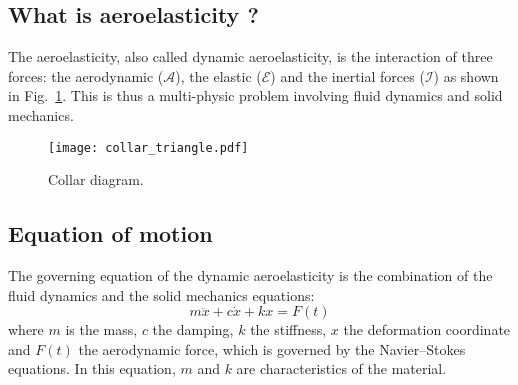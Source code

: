
\subsection{What is aeroelasticity ?}
\label{sub:ael_what_is_aeroelasticity}

The aeroelasticity, also called dynamic aeroelasticity,
is the interaction of three forces:
the aerodynamic ($\mathcal{A}$), the elastic ($\mathcal{E}$) and
the inertial forces ($\mathcal{I}$) as 
shown in Fig.~\ref{fig:ael_collar_triangle}. 
This is thus a 
multi-physic problem involving fluid dynamics and
solid mechanics.
\begin{figure}[htb]
  \centering
  \texttt{[image: collar\_triangle.pdf]}
  \caption{Collar diagram.}
  \label{fig:ael_collar_triangle}
\end{figure} 

\subsection{Equation of motion}
\label{sub:ael_equation}

The governing equation of the dynamic aeroelasticity is
the combination of the fluid dynamics and the solid mechanics
equations:
\begin{equation}
	m \ddot{x} + c \dot{x} + k x = F(t)
	\label{eq:ael_motion_eq}
\end{equation}
where $m$ is the mass, $c$ the damping, $k$ the stiffness, $x$ the deformation
coordinate and $F(t)$ the aerodynamic force, which is governed
by the Navier--Stokes equations. In this equation, $m$
and $k$ are characteristics of the material. 

